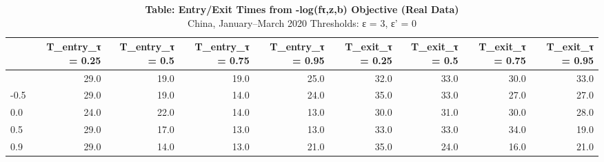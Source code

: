 \begin{table}[t]
\caption*{
{\large \textbf{Table: Entry/Exit Times from -log(fτ,z,b) Objective (Real Data)}} \\ 
{\small China, January--March 2020 \textbar{} Thresholds: ε = 3, ε' = 0}
} 
\begin{tabular*}{\linewidth}{@{\extracolsep{\fill}}l|rrrrrrrr}
\toprule
 & T\_entry\_τ = 0.25 & T\_entry\_τ = 0.5 & T\_entry\_τ = 0.75 & T\_entry\_τ = 0.95 & T\_exit\_τ = 0.25 & T\_exit\_τ = 0.5 & T\_exit\_τ = 0.75 & T\_exit\_τ = 0.95 \\ 
\midrule\addlinespace[2.5pt]
-0.9 & 29.0 & 19.0 & 19.0 & 25.0 & 32.0 & 33.0 & 30.0 & 33.0 \\ 
-0.5 & 29.0 & 19.0 & 14.0 & 24.0 & 35.0 & 33.0 & 27.0 & 27.0 \\ 
0.0 & 24.0 & 22.0 & 14.0 & 13.0 & 30.0 & 31.0 & 30.0 & 28.0 \\ 
0.5 & 29.0 & 17.0 & 13.0 & 13.0 & 33.0 & 33.0 & 34.0 & 19.0 \\ 
0.9 & 29.0 & 14.0 & 13.0 & 21.0 & 35.0 & 24.0 & 16.0 & 21.0 \\ 
\bottomrule
\end{tabular*}
\end{table}

